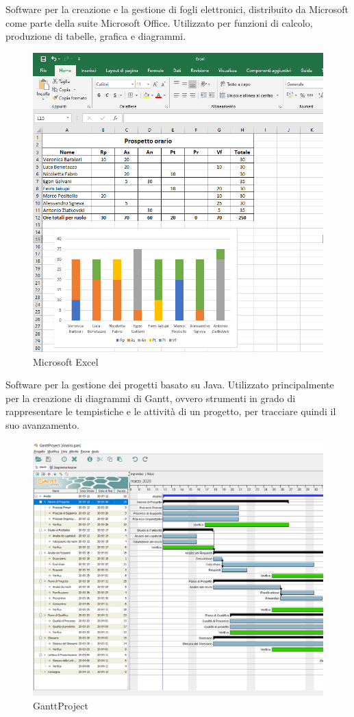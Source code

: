 		Software per la creazione e la gestione di fogli elettronici, distribuito da Microsoft come parte della suite Microsoft Office. Utilizzato per funzioni di calcolo, produzione di tabelle, grafica e diagrammi. \\
		\begin{figure}[h!]
			\centering
			\includegraphics[scale=0.62]{./res/img/excel.png}
			\caption{Microsoft Excel}
		\end{figure}
		\pagebreak
	    Software per la gestione dei progetti basato su Java. Utilizzato principalmente per la creazione di diagrammi di Gantt, ovvero strumenti in grado di rappresentare le tempistiche e le attività di un progetto, per tracciare quindi il suo avanzamento.
	    \begin{figure}[h!]
	    	\centering
	    	\includegraphics[scale=0.5]{./res/img/diagr_gantt.png}
	    	\caption{GanttProject}
	    \end{figure}
	    \pagebreak
